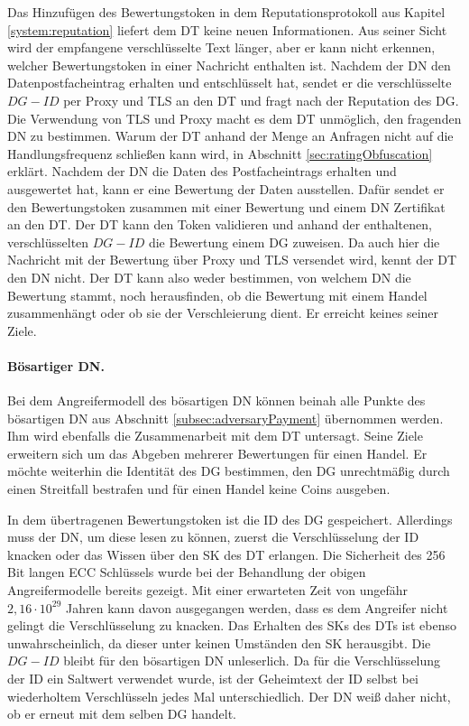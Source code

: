 \documentclass[
	fontsize=11pt,
	headings=small,
	parskip=half,           %
	bibliography=totoc,
	numbers=noenddot,       %
	open=any,               %
]{scrreprt}
\begin{document}
Das Hinzufügen des Bewertungstoken in dem Reputationsprotokoll aus Kapitel \ref{system:reputation} liefert dem DT keine neuen Informationen. Aus seiner Sicht wird der empfangene verschlüsselte Text länger, aber er kann nicht erkennen, welcher Bewertungstoken in einer Nachricht enthalten ist. Nachdem der DN den Datenpostfacheintrag erhalten und entschlüsselt hat, sendet er die verschlüsselte $DG-ID$ per Proxy und TLS an den DT und fragt nach der Reputation des DG. Die Verwendung von TLS und Proxy macht es dem DT unmöglich, den fragenden DN zu bestimmen. Warum der DT anhand der Menge an Anfragen nicht auf die Handlungsfrequenz schließen kann wird, in Abschnitt \ref{sec:ratingObfuscation} erklärt. Nachdem der DN die Daten des Postfacheintrags erhalten und ausgewertet hat, kann er eine Bewertung der Daten ausstellen. Dafür sendet er den Bewertungstoken zusammen mit einer Bewertung und einem DN Zertifikat an den DT. Der DT kann den Token validieren und anhand der enthaltenen, verschlüsselten $DG-ID$ die Bewertung einem DG zuweisen. Da auch hier die Nachricht mit der Bewertung über Proxy und TLS versendet wird, kennt der DT den DN nicht. Der DT kann also weder bestimmen, von welchem DN die Bewertung stammt, noch herausfinden, ob die Bewertung mit einem Handel zusammenhängt oder ob sie der Verschleierung dient. Er erreicht keines seiner Ziele. 

\paragraph{Bösartiger DN.}
Bei dem Angreifermodell des bösartigen DN können beinah alle Punkte des bösartigen DN aus Abschnitt \ref{subsec:adversaryPayment} übernommen werden. Ihm wird ebenfalls die Zusammenarbeit mit dem DT untersagt. Seine Ziele erweitern sich um das Abgeben mehrerer Bewertungen für einen Handel. Er möchte weiterhin die Identität des DG bestimmen, den DG unrechtmäßig durch einen Streitfall bestrafen und für einen Handel keine Coins ausgeben.

In dem übertragenen Bewertungstoken ist die ID des DG gespeichert. Allerdings muss der DN, um diese lesen zu können, zuerst die Verschlüsselung der ID knacken oder das Wissen über den SK des DT erlangen. Die Sicherheit des 256 Bit langen ECC Schlüssels wurde bei der Behandlung der obigen Angreifermodelle bereits gezeigt. Mit einer erwarteten Zeit von ungefähr $2,16\cdot10^{29}$ Jahren kann davon ausgegangen werden, dass es dem Angreifer nicht gelingt die Verschlüsselung zu knacken. Das Erhalten des SKs des DTs ist ebenso unwahrscheinlich, da dieser unter keinen Umständen den SK herausgibt. Die $DG-ID$ bleibt für den bösartigen DN unleserlich. Da für die Verschlüsselung der ID ein Saltwert verwendet wurde, ist der Geheimtext der ID selbst bei wiederholtem Verschlüsseln jedes Mal unterschiedlich. Der DN weiß daher nicht, ob er erneut mit dem selben DG handelt.
\end{document}
